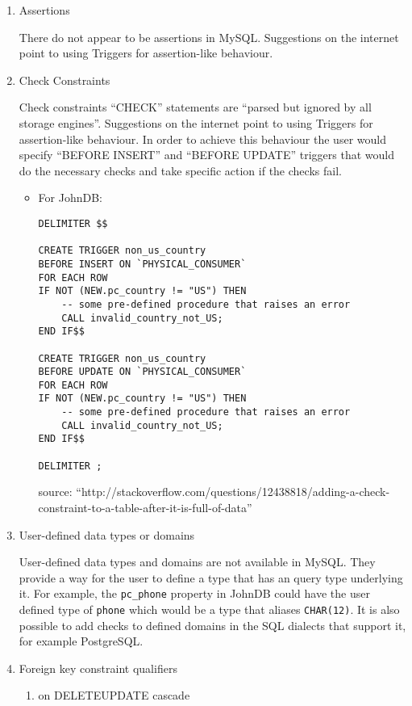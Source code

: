 \documentclass[]{article}
\begin{document}
\begin{enumerate}
\item Assertions

There do not appear to be assertions in MySQL. Suggestions on the internet point to using Triggers for assertion-like behaviour.

\item Check Constraints

Check constraints ``CHECK'' statements are ``parsed but ignored by all storage engines''. Suggestions on the internet point to using Triggers for assertion-like behaviour. In order to achieve this behaviour the user would specify ``BEFORE INSERT'' and ``BEFORE UPDATE'' triggers that would do the necessary checks and take specific action if the checks fail.

\begin{itemize}
\item For JohnDB:

\begin{verbatim}
DELIMITER $$

CREATE TRIGGER non_us_country
BEFORE INSERT ON `PHYSICAL_CONSUMER`
FOR EACH ROW
IF NOT (NEW.pc_country != "US") THEN
    -- some pre-defined procedure that raises an error
    CALL invalid_country_not_US;  
END IF$$

CREATE TRIGGER non_us_country
BEFORE UPDATE ON `PHYSICAL_CONSUMER`
FOR EACH ROW
IF NOT (NEW.pc_country != "US") THEN
    -- some pre-defined procedure that raises an error
    CALL invalid_country_not_US;
END IF$$

DELIMITER ;
\end{verbatim}
source: ``http://stackoverflow.com/questions/12438818/adding-a-check-constraint-to-a-table-after-it-is-full-of-data''\\
\end{itemize}


\item User-defined data types or domains

User-defined data types and domains are not available in MySQL. They provide a way for the user to define a type that has an query type underlying it. For example, the \texttt{pc\_phone} property in JohnDB could have the user defined type of \texttt{phone} which would be a type that aliases \texttt{CHAR(12)}. It is also possible to add checks to defined domains in the SQL dialects that support it, for example PostgreSQL.

\item Foreign key constraint qualifiers
    \begin{enumerate}
	\item on DELETE\textbar UPDATE cascade


\end{enumerate}
\end{enumerate}
\end{document}
